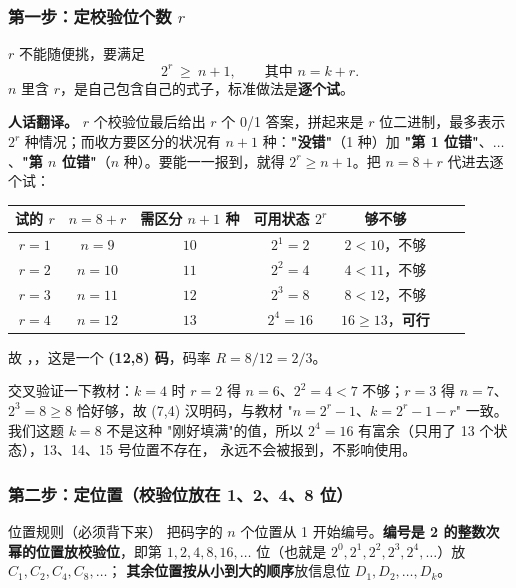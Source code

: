 \subsubsection{第一步：定校验位个数 $r$}

$r$ 不能随便挑，要满足
\[
2^{r}\ \ge\ n+1,\qquad\text{其中 } n=k+r .
\]
$n$ 里含 $r$，是自己包含自己的式子，标准做法是\textbf{逐个试}。

\textbf{人话翻译。} $r$ 个校验位最后给出 $r$ 个 0/1 答案，拼起来是 $r$ 位二进制，最多表示
$2^{r}$ 种情况；而收方要区分的状况有 $n+1$ 种：\textbf{"没错"}（1 种）加
\textbf{"第 1 位错"}、$\dots$、\textbf{"第 $n$ 位错"}（$n$ 种）。要能一一报到，就得
$2^{r}\ge n+1$。把 $n=8+r$ 代进去逐个试：

\begin{center}\small
\setlength{\tabcolsep}{6pt}
\begin{tabular}{@{}ccccccl@{}}
\toprule
试的 $r$ & $n=8+r$ & 需区分 $n+1$ 种 & 可用状态 $2^{r}$ & 够不够\\
\midrule
$r=1$ & $n=9$ & $10$ & $2^{1}=2$ & $2<10$，不够\\
$r=2$ & $n=10$ & $11$ & $2^{2}=4$ & $4<11$，不够\\
$r=3$ & $n=11$ & $12$ & $2^{3}=8$ & $8<12$，不够\\
$r=4$ & $n=12$ & $13$ & $2^{4}=16$ & $16\ge13$，\textbf{可行}\\
\bottomrule
\end{tabular}
\end{center}

故 ，，这是一个 \textbf{(12,8) 码}，码率 $R=8/12=2/3$。

交叉验证一下教材：$k=4$ 时 $r=2$ 得 $n=6$、$2^{2}=4<7$ 不够；$r=3$ 得 $n=7$、$2^{3}=8\ge8$
恰好够，故 (7,4) 汉明码，与教材 "$n=2^{r}-1$、$k=2^{r}-1-r$" 一致。我们这题 $k=8$ 不是这种
"刚好填满"的值，所以 $2^{4}=16$ 有富余（只用了 13 个状态），13、14、15 号位置不存在，
永远不会被报到，不影响使用。

\subsubsection{第二步：定位置（校验位放在 1、2、4、8 位）}

\begin{defbox}{位置规则（必须背下来）}
把码字的 $n$ 个位置从 1 开始编号。\textbf{编号是 2 的整数次幂的位置放校验位}，即第
$1,2,4,8,16,\dots$ 位（也就是 $2^{0},2^{1},2^{2},2^{3},2^{4},\dots$）放 $C_1,C_2,C_4,C_8,\dots$；
\textbf{其余位置按从小到大的顺序}放信息位 $D_1,D_2,\dots,D_k$。
\end{defbox}


